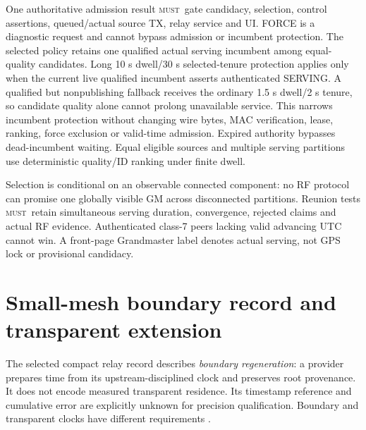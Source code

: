 \documentclass[11pt,letterpaper]{article}
\newcommand{\page}{\clearpage}
\newcommand{\must}{\textsc{must}}
\begin{document}
One authoritative admission result \must\ gate candidacy, selection, control assertions, queued/actual source TX, relay service and UI. FORCE is a diagnostic request and cannot bypass admission or incumbent protection. The selected policy retains one qualified actual serving incumbent among equal-quality candidates. Long 10 s dwell/30 s selected-tenure protection applies only when the current live qualified incumbent asserts authenticated SERVING. A qualified but nonpublishing fallback receives the ordinary 1.5 s dwell/2 s tenure, so candidate quality alone cannot prolong unavailable service. This narrows incumbent protection without changing wire bytes, MAC verification, lease, ranking, force exclusion or valid-time admission. Expired authority bypasses dead-incumbent waiting. Equal eligible sources and multiple serving partitions use deterministic quality/ID ranking under finite dwell.

Selection is conditional on an observable connected component: no RF protocol can promise one globally visible GM across disconnected partitions. Reunion tests \must\ retain simultaneous serving duration, convergence, rejected claims and actual RF evidence. Authenticated class-7 peers lacking valid advancing UTC cannot win. A front-page Grandmaster label denotes actual serving, not GPS lock or provisional candidacy.

\page
\section{Small-mesh boundary record and transparent extension}\label{sec:mesh}
The selected compact relay record describes \emph{boundary regeneration}: a provider prepares time from its upstream-disciplined clock and preserves root provenance. It does not encode measured transparent residence. Its timestamp reference and cumulative error are explicitly unknown for precision qualification. Boundary and transparent clocks have different requirements \cite{ptp}.
\end{document}
